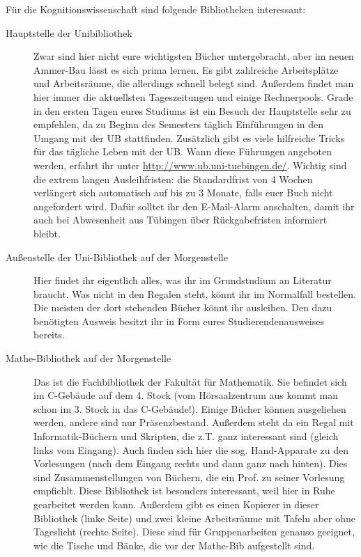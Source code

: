 
Für die Kognitionswissenschaft sind folgende Bibliotheken interessant:
\begin{description}
	\item[Hauptstelle der Unibibliothek] Zwar sind hier nicht eure wichtigsten
	Bücher untergebracht, aber im neuen Ammer-Bau lässt es sich prima
	lernen. Es gibt zahlreiche Arbeitsplätze und Arbeitsräume, die
	allerdings schnell belegt sind. Außerdem findet man hier immer die
	aktuellsten Tageszeitungen und einige Rechnerpools.
	Grade in den ersten Tagen eures Studiums ist ein Besuch der Hauptstelle
	sehr zu empfehlen, da zu Beginn des Semesters täglich Einführungen in den Umgang mit der UB stattfinden. Zusätzlich gibt es viele hilfreiche Tricks für das tägliche Leben mit der UB. Wann diese Führungen angeboten werden, erfahrt ihr unter  \url{http://www.ub.uni-tuebingen.de/}. Wichtig sind die extrem langen Ausleihfristen: die Standardfrist von 4 Wochen verlängert sich automatisch auf bis zu 3 Monate, falls euer Buch nicht angefordert wird. Dafür solltet ihr den E-Mail-Alarm anschalten, damit ihr auch bei Abwesenheit aus Tübingen über Rückgabefristen informiert bleibt.
	
	\item[Außenstelle der Uni-Bibliothek auf der Morgenstelle]
	Hier findet ihr eigentlich alles, was ihr im Grundstudium an
	Literatur braucht.  Was nicht in den Regalen steht, könnt ihr
	im Normalfall bestellen.  Die meisten der dort stehenden Bücher könnt ihr
	ausleihen. Den dazu benötigten Ausweis besitzt ihr in Form eures Studierendenausweises bereits.
	
	\item[Mathe-Bibliothek auf der Morgenstelle]
	Das ist die Fachbibliothek der Fakultät für Mathematik. Sie
	befindet sich im C-Gebäude auf dem 4. Stock (vom
	Hörsaalzentrum aus kommt man schon im 3. Stock in das
	C-Gebäude!). Einige Bücher können ausgeliehen werden,
	andere sind nur Präsenzbestand.  Außerdem steht da ein Regal
	mit Informatik-Büchern und Skripten, die z.T. ganz
	interessant sind (gleich links vom Eingang).  Auch finden sich
	hier die sog. Hand-Apparate zu den Vorlesungen (nach dem
	Eingang rechts und dann ganz nach hinten).  Dies sind
	Zusammenstellungen von Büchern, die ein Prof. zu seiner
	Vorlesung empfiehlt.  Diese Bibliothek ist besonders
	interessant, weil hier in Ruhe gearbeitet werden kann.
	Außerdem gibt es einen Kopierer in dieser Bibliothek (linke
	Seite) und zwei kleine Arbeitsräume mit Tafeln aber ohne
	Tageslicht (rechte Seite).  Diese sind für Gruppenarbeiten
	genauso geeignet, wie die Tische und Bänke, die vor der
	Mathe-Bib aufgestellt sind.
	

\end{description}
